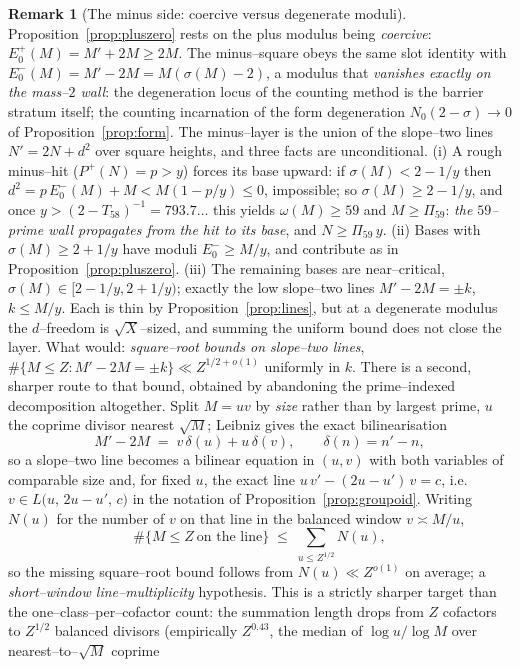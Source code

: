 \documentclass[11pt]{article}
\theoremstyle{definition}
\newtheorem{remark}[theorem]{Remark}
\begin{document}
\begin{remark}[The minus side: coercive versus degenerate moduli]\label{rem:minusslot}
Proposition~\ref{prop:pluszero} rests on the plus modulus being \emph{coercive}:
$E_0^+(M)=M'+2M\ge2M$. The minus--square obeys the same slot identity with
$E_0^-(M)=M'-2M=M(\sigma(M)-2)$, a modulus that \emph{vanishes exactly on the mass--$2$ wall}: the
degeneration locus of the counting method is the barrier stratum itself; the counting
incarnation of the form degeneration $N_0(2-\sigma)\to0$ of Proposition~\ref{prop:form}. The
minus--layer is the union of the slope--two lines $N'=2N+d^2$ over square heights, and three facts
are unconditional. \textup{(i)} A rough minus--hit ($P^+(N)=p>y$) forces its base upward: if
$\sigma(M)<2-1/y$ then $d^2=p\,E_0^-(M)+M<M(1-p/y)\le0$, impossible; so $\sigma(M)\ge2-1/y$, and
once $y>(2-T_{58})^{-1}=793.7\ldots$ this yields $\omega(M)\ge59$ and $M\ge\Pi_{59}$: \emph{the
$59$--prime wall propagates from the hit to its base}, and $N\ge\Pi_{59}\,y$. \textup{(ii)} Bases
with $\sigma(M)\ge2+1/y$ have moduli $E_0^-\ge M/y$, and contribute as in
Proposition~\ref{prop:pluszero}. \textup{(iii)} The remaining bases are near--critical,
$\sigma(M)\in[2-1/y,2+1/y)$; exactly the low slope--two lines $M'-2M=\pm k$, $k\le M/y$. Each is
thin by Proposition~\ref{prop:lines}, but at a degenerate modulus the $d$--freedom is
$\sqrt X$--sized, and summing the uniform bound does not close the layer. What would:
\emph{square--root bounds on slope--two lines}, $\#\{M\le Z:M'-2M=\pm k\}\ll Z^{1/2+o(1)}$
uniformly in $k$. There is a second, sharper route to that bound, obtained by abandoning the
prime--indexed decomposition altogether. Split $M=uv$ by \emph{size} rather than by largest prime,
$u$ the coprime divisor nearest $\sqrt M$; Leibniz gives the exact bilinearisation
\[ M'-2M\;=\;v\,\delta(u)+u\,\delta(v),\qquad \delta(n)=n'-n, \]
so a slope--two line becomes a bilinear equation in $(u,v)$ with both variables of comparable size
and, for fixed $u$, the exact line $u\,v'-(2u-u')\,v=c$, i.e.\ $v\in L\bigl(u,\,2u-u',\,c\bigr)$
in the notation of Proposition~\ref{prop:groupoid}. Writing $N(u)$ for the number of $v$ on that
line in the balanced window $v\asymp M/u$,
\[ \#\{M\le Z\ \text{on the line}\}\;\le\;\sum_{u\le Z^{1/2}}N(u), \]
so the missing square--root bound follows from $N(u)\ll Z^{o(1)}$ on average; a
\emph{short--window line--multiplicity} hypothesis. This is a strictly sharper target than the
one--class--per--cofactor count: the summation length drops from $Z$ cofactors to $Z^{1/2}$ balanced
divisors (empirically $Z^{0.43}$, the median of $\log u/\log M$ over nearest--to--$\sqrt M$ coprime

\end{remark}
\end{document}
